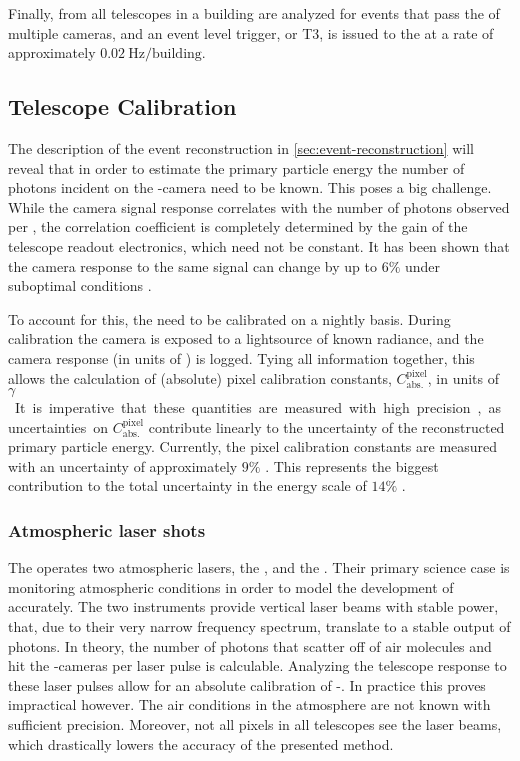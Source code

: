 Finally, \TLTs from all telescopes in a building are analyzed for events that
pass the \FOV of multiple cameras, and an event level trigger, or T3, is issued
to the \CDAS at a rate of approximately 
$\SI{0.02}{\hertz\per\mathrm{building}}$.

\subsection{Telescope Calibration}
\label{ssec:fd-calibration}

The description of the event reconstruction in \cref{sec:event-reconstruction}
will reveal that in order to estimate the primary particle energy the number of
photons incident on the \FD-camera need to be known. This poses a big challenge.
While the camera signal response correlates with the number of photons observed
per \EAS, the correlation coefficient is completely determined by the gain of 
the telescope readout electronics, which need not be constant. It has been shown
that the camera response to the same signal can change by up to $6\%$ under 
suboptimal conditions \cite{filipJumpsXYCalibration2024}.

To account for this, the \PMTs need to be calibrated on a nightly basis. During
calibration the camera is exposed to a lightsource of known radiance, and the 
camera response (in units of \ADC) is logged. Tying all information together, 
this allows the calculation of (absolute) pixel calibration constants, 
$C^\mathrm{pixel}_\mathrm{abs.}$, in units of \SI{}{$\gamma$\per\ADC}. It is
imperative that these quantities are measured with high precision, as
uncertainties on $C^\mathrm{pixel}_\mathrm{abs.}$ contribute linearly to the 
uncertainty of the reconstructed primary particle energy. Currently, the pixel
calibration constants are measured with an uncertainty of approximately $9\%$
\cite{dawsonUpdateAugerEnergy13}. This represents the biggest contribution to 
the total uncertainty in the \PAO energy scale of $14\%$ 
\cite{verziEnergyScalePierre2013}.

\subsubsection{Atmospheric laser shots}

The \PAO operates two atmospheric lasers, the \CLF, and the \XLF 
\cite{collaborationTechniquesMeasuringAerosol2013}. Their primary science case 
is monitoring atmospheric conditions in order to model the development of \EASs
accurately. The two instruments provide vertical laser beams with stable power,
that, due to their very narrow frequency spectrum, translate to a stable
output of photons. In theory, the number of photons that scatter off of air 
molecules and hit the \FD-cameras per laser pulse is calculable. Analyzing the
telescope response to these laser pulses allow for an absolute calibration of 
\FD-\PMTs. In practice this proves impractical however. The air conditions in 
the atmosphere are not known with sufficient precision. Moreover, not all
pixels in all telescopes see the laser beams, which drastically lowers the 
accuracy of the presented method.

